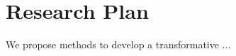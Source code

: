 
\section{Research Plan}
\label{sec:resplan}

We propose methods to develop a transformative  ...









